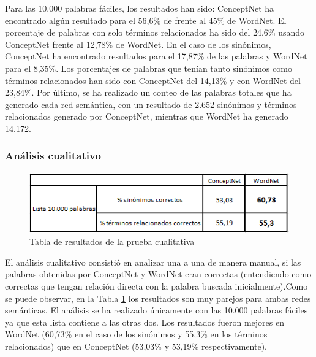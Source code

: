 Para las 10.000 palabras fáciles, los resultados han sido: ConceptNet ha encontrado algún resultado para el 56,6\% de frente al 45\% de WordNet. El porcentaje de palabras con solo términos relacionados ha sido del 24,6\% usando ConceptNet frente al 12,78\% de WordNet. En el caso de los sinónimos, ConceptNet ha encontrado resultados para el 17,87\% de las palabras y WordNet para el 8,35\%. Los porcentajes de palabras que tenían tanto sinónimos como términos relacionados han sido con ConceptNet del 14,13\% y con WordNet del 23,84\%. Por último, se ha realizado un conteo de las palabras totales que ha generado cada red semántica, con un resultado de 2.652 sinónimos y términos relacionados generado por ConceptNet, mientras que WordNet ha generado 14.172.




\subsubsection{Análisis cualitativo}
\label{sssec:pruebaCualitativa}

\begin{figure}[!h]
	\includegraphics[width=.7\textwidth]{Imagenes/Bitmap/Capitulo4/tabla_cualitativa}
	\centering
	\caption{Tabla de resultados de la prueba cualitativa}
	\label{fig:tabla_cualitativa}
\end{figure}

El análisis cualitativo consistió en analizar una a una de manera manual, si las palabras obtenidas por ConceptNet y WordNet eran correctas (entendiendo como correctas que tengan relación directa con la palabra buscada inicialmente).Como se puede observar, en la Tabla \ref{fig:tabla_cualitativa} los resultados son muy parejos para ambas redes semánticas. El análisis se ha realizado únicamente con las 10.000 palabras fáciles ya que esta lista contiene a las otras dos. Los resultados fueron mejores en WordNet (60,73\% en el caso de los sinónimos y 55,3\% en los términos relacionados) que en ConceptNet (53,03\% y 53,19\% respectivamente).


